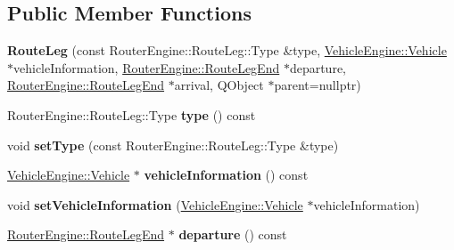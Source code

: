 \subsection*{Public Member Functions}
\begin{DoxyCompactItemize}
\item 
\mbox{\label{classRouterEngine_1_1RouteLeg_a1c2b7ecc87cab7b5a4ff69d07f4e646a}} 
{\bfseries Route\+Leg} (const Router\+Engine\+::\+Route\+Leg\+::\+Type \&type, \mbox{\hyperlink{classVehicleEngine_1_1Vehicle}{Vehicle\+Engine\+::\+Vehicle}} $\ast$vehicle\+Information, \mbox{\hyperlink{classRouterEngine_1_1RouteLegEnd}{Router\+Engine\+::\+Route\+Leg\+End}} $\ast$departure, \mbox{\hyperlink{classRouterEngine_1_1RouteLegEnd}{Router\+Engine\+::\+Route\+Leg\+End}} $\ast$arrival, Q\+Object $\ast$parent=nullptr)
\item 
\mbox{\label{classRouterEngine_1_1RouteLeg_a30acf2e2a57217cd2f588475ea3c6e80}} 
Router\+Engine\+::\+Route\+Leg\+::\+Type {\bfseries type} () const
\item 
\mbox{\label{classRouterEngine_1_1RouteLeg_ada52c9281e1b545753e0beeded6f8e4a}} 
void {\bfseries set\+Type} (const Router\+Engine\+::\+Route\+Leg\+::\+Type \&type)
\item 
\mbox{\label{classRouterEngine_1_1RouteLeg_a086d61b828cd572797ec327710eb4088}} 
\mbox{\hyperlink{classVehicleEngine_1_1Vehicle}{Vehicle\+Engine\+::\+Vehicle}} $\ast$ {\bfseries vehicle\+Information} () const
\item 
\mbox{\label{classRouterEngine_1_1RouteLeg_a535891ef84cac1a875b3f1a58404c227}} 
void {\bfseries set\+Vehicle\+Information} (\mbox{\hyperlink{classVehicleEngine_1_1Vehicle}{Vehicle\+Engine\+::\+Vehicle}} $\ast$vehicle\+Information)
\item 
\mbox{\label{classRouterEngine_1_1RouteLeg_a77dd1b04134b55cbc6dc031f5e6d6379}} 
\mbox{\hyperlink{classRouterEngine_1_1RouteLegEnd}{Router\+Engine\+::\+Route\+Leg\+End}} $\ast$ {\bfseries departure} () const
\item 
\mbox{\label{classRouterEngine_1_1RouteLeg_a80f8a85b74c662e1832313677a5bc7f3}} 

\end{DoxyCompactItemize}
